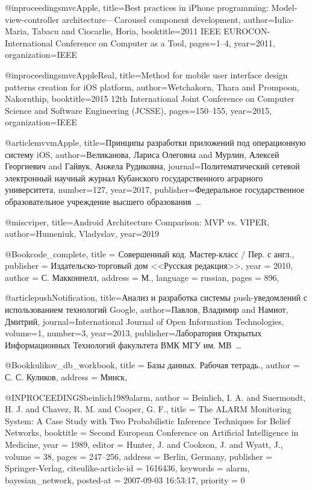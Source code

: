 @inproceedings{mvcApple,
  title={Best practices in iPhone programming: Model-view-controller architecture—Carousel component development},
  author={Iulia-Maria, Tabacu and Ciocarlie, Horia},
  booktitle={2011 IEEE EUROCON-International Conference on Computer as a Tool},
  pages={1--4},
  year={2011},
  organization={IEEE}
}

@inproceedings{mvcAppleReal,
  title={Method for mobile user interface design patterns creation for iOS platform},
  author={Wetchakorn, Thara and Prompoon, Nakornthip},
  booktitle={2015 12th International Joint Conference on Computer Science and Software Engineering (JCSSE)},
  pages={150--155},
  year={2015},
  organization={IEEE}
}

@article{mvvmApple,
  title={Принципы разработки приложений под операционную систему iOS},
  author={Великанова, Лариса Олеговна and Мурлин, Алексей Георгиевич and Гайвук, Анжела Рудиковна},
  journal={Политематический сетевой электронный научный журнал Кубанского государственного аграрного университета},
  number={127},
  year={2017},
  publisher={Федеральное государственное образовательное учреждение высшего образования~…}
}

@misc{viper,
  title={Android Architecture Comparison: MVP vs. VIPER},
  author={Humeniuk, Vladyslav},
  year={2019}
}

@Book{code_complete,
  title     = {Совершенный код. Мастер-класс / Пер. с англ.},
  publisher = {Издательско-торговый дом <<Русская редакция>>},
  year      = {2010},
  author    = {С. Макконнелл},
  address   = {М.},
  language  = {russian},
  pages     = {896},
}


@article{pushNotification,
  title={Анализ и разработка системы push-уведомлений с использованием технологий Google},
  author={Павлов, Владимир and Намиот, Дмитрий},
  journal={International Journal of Open Information Technologies},
  volume={1},
  number={3},
  year={2013},
  publisher={Лаборатория Открытых Информационных Технологий факультета ВМК МГУ им. МВ~…}
}

@Book{kulikov_db_workbook,
  title   = {Базы данных. Рабочая тетрадь.},
  author  = {С. С. Куликов},
  address = {Минск},
}

@INPROCEEDINGS{beinlich1989alarm,
  author = {Beinlich, I. A. and Suermondt, H. J. and Chavez, R. M. and Cooper,
	G. F.},
  title = {{The ALARM Monitoring System: A Case Study with Two Probabilistic
	Inference Techniques for Belief Networks}},
  booktitle = {Second European Conference on Artificial Intelligence in Medicine},
  year = {1989},
  editor = {Hunter, J. and Cookson, J. and Wyatt, J.},
  volume = {38},
  pages = {247--256},
  address = {Berlin, Germany},
  publisher = {Springer-Verlag},
  citeulike-article-id = {1616436},
  keywords = {alarm, bayesian\_network},
  posted-at = {2007-09-03 16:53:17},
  priority = {0}
}

